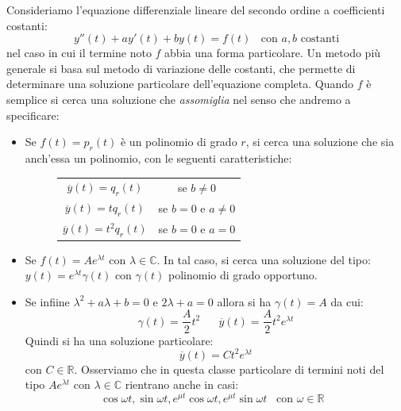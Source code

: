 \documentclass[a4paper]{article}
\numberwithin{equation}{subsection}
\begin{document}
Consideriamo l'equazione differenziale lineare del secondo ordine a coefficienti costanti:
\[y''(t) + ay'(t) + by(t) = f(t) \; \; \text{ con $a, b$ costanti}\]
nel caso in cui il termine noto $f$ abbia una forma particolare. 
Un metodo più generale si basa sul metodo di variazione delle costanti, che permette di determinare una soluzione particolare dell'equazione completa.
Quando $f$ è semplice si cerca una soluzione che \textit{assomiglia} nel senso che andremo a specificare:
\begin{itemize}
    \item Se $f(t) = p_r(t)$ è un polinomio di grado $r$, si cerca una soluzione che sia anch'essa un polinomio, con le seguenti caratteristiche:
    \begin{figure}[H]
        \centering
        \begin{tabular}{|c|c|}
            \hline
            $\overline{y}(t) = q_r(t)$ & se $b \neq 0$\\
            $\overline{y}(t) = tq_r(t)$ & se $b = 0$ e $a \neq 0$\\
            $\overline{y}(t) = t^2q_r(t)$ & se $b = 0$ e $a = 0$\\
            \hline
            
        \end{tabular}
    
    \end{figure}
    \item Se $f(t) = Ae^{\lambda t}$ con $\lambda \in \mathbb{C}$. In tal caso, si cerca una soluzione del tipo:
    $y(t) = e^{\lambda t}\gamma(t)$ con $\gamma(t)$ polinomio di grado opportuno.
    \item Se infiine $\lambda^2 + a\lambda + b = 0$ e $2\lambda + a = 0$ allora si ha $\gamma(t) = A$ da cui:
    \[\gamma(t) = \frac{A}{2}t^2 \; \; \; \; \; \;  \overline{y}(t) = \frac{A}{2}t^2e^{\lambda t}\] 
    Quindi si ha una soluzione particolare:
    \[\overline{y}(t) = Ct^2e^{\lambda t}\]
    con $C \in \mathbb{R}$. 
    Osserviamo che in questa classe particolare di termini noti del tipo $Ae^{\lambda t}$ con $\lambda \in \mathbb{C}$ rientrano anche in casi:
    \[\cos{\omega t},\sin{\omega t}, e^{\mu t}\cos{\omega t}, e^{\mu t}\sin{\omega t} \; \; \; \text{con $\omega \in \mathbb{R}$ }\]

\end{itemize}
\end{document}
